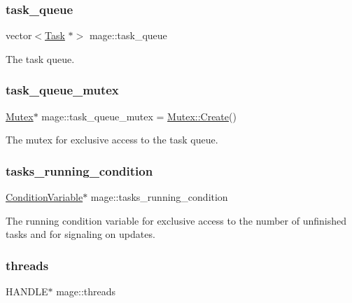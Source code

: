 \subsubsection{\texorpdfstring{task\+\_\+queue}{task\_queue}}
{\footnotesize\ttfamily vector$<$\hyperlink{classmage_1_1_task}{Task} $\ast$$>$ mage\+::task\+\_\+queue\hspace{0.3cm}{\ttfamily [static]}}

The task queue. \hypertarget{namespacemage_a7de4544ddddcf8e0d54dbfdc0778f13f}{}\label{namespacemage_a7de4544ddddcf8e0d54dbfdc0778f13f} 
\subsubsection{\texorpdfstring{task\+\_\+queue\+\_\+mutex}{task\_queue\_mutex}}
{\footnotesize\ttfamily \hyperlink{classmage_1_1_mutex}{Mutex}$\ast$ mage\+::task\+\_\+queue\+\_\+mutex = \hyperlink{classmage_1_1_mutex_a48d784fa6bffd4088d9f89a2a9cca84e}{Mutex\+::\+Create}()\hspace{0.3cm}{\ttfamily [static]}}

The mutex for exclusive access to the task queue. \hypertarget{namespacemage_a8c04b4285ebbc0fb416b1905c01cf149}{}\label{namespacemage_a8c04b4285ebbc0fb416b1905c01cf149} 
\subsubsection{\texorpdfstring{tasks\+\_\+running\+\_\+condition}{tasks\_running\_condition}}
{\footnotesize\ttfamily \hyperlink{classmage_1_1_condition_variable}{Condition\+Variable}$\ast$ mage\+::tasks\+\_\+running\+\_\+condition\hspace{0.3cm}{\ttfamily [static]}}

The running condition variable for exclusive access to the number of unfinished tasks and for signaling on updates. \hypertarget{namespacemage_a15e9f7d36194ec1b768a82a2294cce6c}{}\label{namespacemage_a15e9f7d36194ec1b768a82a2294cce6c} 
\subsubsection{\texorpdfstring{threads}{threads}}
{\footnotesize\ttfamily H\+A\+N\+D\+LE$\ast$ mage\+::threads\hspace{0.3cm}{\ttfamily [static]}}

